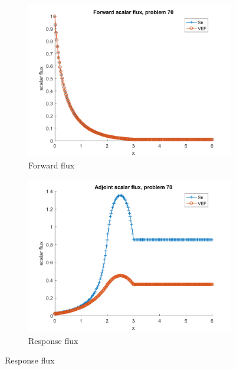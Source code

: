 \documentclass{article}
\begin{document}
\begin{figure}[H]
\label{Case70Flux}
\centering
\begin{subfigure}{.5\textwidth}
  \centering
  \includegraphics[width=.98\linewidth]{IanProposal/figures2/70phi.png}
  \caption{Forward flux}
  \label{fig:sfig1}
\end{subfigure}%
\begin{subfigure}{.5\textwidth}
  \centering
  \includegraphics[width=.98\linewidth]{IanProposal/figures2/70phia.png}
  \caption{Response flux}
  \label{fig:sfig4}
\end{subfigure}%
\end{figure}
\end{document}
